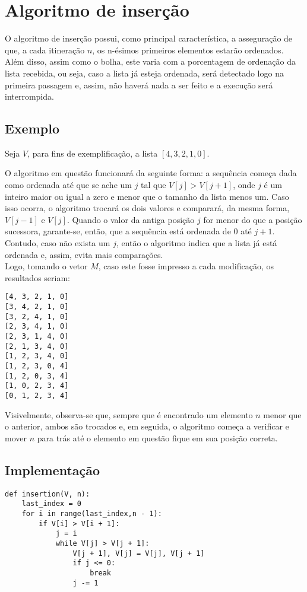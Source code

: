 \section{Algoritmo de inserção}
O algoritmo de inserção possui, como principal característica, a asseguração de que, a cada itineração $n$, os n-ésimos primeiros elementos estarão ordenados. Além disso, assim como o bolha, este varia com a porcentagem de ordenação da lista recebida, ou seja, caso a lista já esteja ordenada, será detectado logo na primeira passagem e, assim, não haverá nada a ser feito e a execução será interrompida. 


\subsection{Exemplo}
Seja $V$, para fins de exemplificação, a lista $[4,3,2,1,0]$.  

O algoritmo em questão funcionará da seguinte forma: a sequência começa dada como ordenada até que se ache um $j$ tal que $V[j]>V[j+1]$, onde $j$ é um inteiro maior ou igual a zero e menor que o tamanho da lista menos um. 
Caso isso ocorra, o algoritmo trocará os dois valores e comparará, da mesma forma, $V[j-1]$ e $V[j]$. Quando o valor da antiga posição $j$ for menor do que a posição sucessora, garante-se, então, que a sequência está ordenada de 0 até $j+1$. Contudo, caso não exista um $j$, então o algoritmo indica que a lista já está ordenada e, assim, evita mais comparações.
\\

Logo, tomando o vetor $M$, caso este fosse impresso a cada modificação, os resultados seriam:
\begin{lstlisting}
[4, 3, 2, 1, 0]
[3, 4, 2, 1, 0]
[3, 2, 4, 1, 0]
[2, 3, 4, 1, 0]
[2, 3, 1, 4, 0]
[2, 1, 3, 4, 0]
[1, 2, 3, 4, 0]
[1, 2, 3, 0, 4]
[1, 2, 0, 3, 4]
[1, 0, 2, 3, 4]
[0, 1, 2, 3, 4]
\end{lstlisting}

Visivelmente, observa-se que, sempre que é encontrado um elemento $n$ menor que o anterior, ambos são trocados e, em seguida, o algoritmo começa a verificar e mover $n$ para trás até o elemento em questão fique em sua posição correta.
\newpage

\subsection{Implementação}

\begin{lstlisting}
def insertion(V, n):
    last_index = 0
    for i in range(last_index,n - 1):
        if V[i] > V[i + 1]:
            j = i
            while V[j] > V[j + 1]:
                V[j + 1], V[j] = V[j], V[j + 1]
                if j <= 0:
                    break
                j -= 1
\end{lstlisting}

